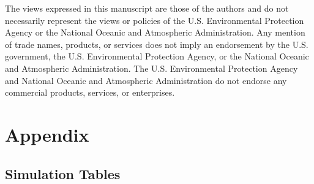 \documentclass[smallextended]{svjour3}       %
\begin{document}
The views expressed in this manuscript are those of the authors and do
not necessarily represent the views or policies of the U.S.
Environmental Protection Agency or the National Oceanic and Atmospheric
Administration. Any mention of trade names, products, or services does
not imply an endorsement by the U.S. government, the U.S. Environmental
Protection Agency, or the National Oceanic and Atmospheric
Administration. The U.S. Environmental Protection Agency and National
Oceanic and Atmospheric Administration do not endorse any commercial
products, services, or enterprises.

\setcounter{table}{0}
\setcounter{subsection}{0}
\renewcommand{\thetable}{A\arabic{table}}
\renewcommand{\thesubsection}{A.\arabic{subsection}:}

\hypertarget{appendix}{%
\section*{Appendix}\label{appendix}}

\subsection{Simulation Tables}
\end{document}
